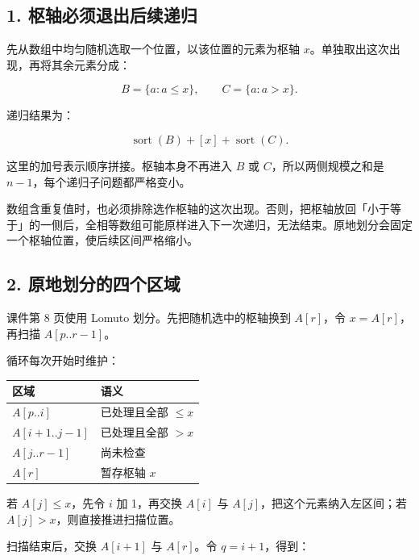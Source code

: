 \documentclass[
  UTF8,fontset=none,zihao=5]{ctexart}
\let\OldSubsection\subsection
\renewcommand{\subsection}{\Needspace{4\baselineskip}\OldSubsection}
\begin{document}
\hypertarget{ux67a2ux8f74ux5fc5ux987bux9000ux51faux540eux7eedux9012ux5f52}{%
\subsection{1.
枢轴必须退出后续递归}\label{ux67a2ux8f74ux5fc5ux987bux9000ux51faux540eux7eedux9012ux5f52}}

先从数组中均匀随机选取一个位置，以该位置的元素为枢轴
\(x\)。单独取出这次出现，再将其余元素分成：

\[
B=\{a:a\le x\},\qquad C=\{a:a>x\}.
\]

递归结果为：

\[
\operatorname{sort}(B)+[x]+\operatorname{sort}(C).
\]

这里的加号表示顺序拼接。枢轴本身不再进入 \(B\) 或
\(C\)，所以两侧规模之和是 \(n-1\)，每个递归子问题都严格变小。

数组含重复值时，也必须排除选作枢轴的这次出现。否则，把枢轴放回「小于等于」的一侧后，全相等数组可能原样进入下一次递归，无法结束。原地划分会固定一个枢轴位置，使后续区间严格缩小。

\hypertarget{ux539fux5730ux5212ux5206ux7684ux56dbux4e2aux533aux57df}{%
\subsection{2.
原地划分的四个区域}\label{ux539fux5730ux5212ux5206ux7684ux56dbux4e2aux533aux57df}}

课件第 8 页使用 Lomuto 划分。先把随机选中的枢轴换到 \(A[r]\)，令
\(x=A[r]\)，再扫描 \(A[p..r-1]\)。

循环每次开始时维护：

\begin{longtable}[]{@{}
  >{\raggedright\arraybackslash}p{}
  >{\raggedright\arraybackslash}p{}@{}}
\toprule
区域 & 语义 \\
\midrule
\endhead
\(A[p..i]\) & 已处理且全部 \(\le x\) \\
\(A[i+1..j-1]\) & 已处理且全部 \(>x\) \\
\(A[j..r-1]\) & 尚未检查 \\
\(A[r]\) & 暂存枢轴 \(x\) \\
\bottomrule
\end{longtable}

若 \(A[j]\le x\)，先令 \(i\) 加 1，再交换 \(A[i]\) 与
\(A[j]\)，把这个元素纳入左区间；若 \(A[j]>x\)，则直接推进扫描位置。

扫描结束后，交换 \(A[i+1]\) 与 \(A[r]\)。令 \(q=i+1\)，得到：
\end{document}
